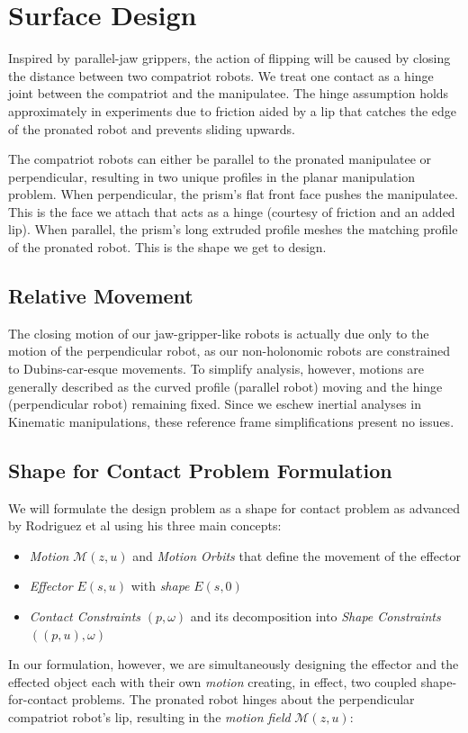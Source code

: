 \documentclass[letterpaper]{report}
\begin{document}
\section{Surface Design}
Inspired by parallel-jaw grippers, the action of flipping will be caused by closing the distance between two compatriot robots.
We treat one contact as a hinge joint between the compatriot and the manipulatee.
The hinge assumption holds approximately in experiments due to friction aided by a lip that catches the edge of the pronated robot and prevents sliding upwards.

The compatriot robots can either be parallel to the pronated manipulatee or perpendicular, resulting in two unique profiles in the planar manipulation problem.
When perpendicular, the prism's flat front face pushes the manipulatee. This is the face we attach that acts as a hinge (courtesy of friction and an added lip).
When parallel, the prism's long extruded profile meshes the matching profile of the pronated robot. This is the shape we get to design.

\subsection{Relative Movement}
The closing motion of our jaw-gripper-like robots is actually due only to the motion of the perpendicular robot, as our non-holonomic robots are constrained to Dubins-car-esque movements.
To simplify analysis, however, motions are generally described as the curved profile (parallel robot) moving and the hinge (perpendicular robot) remaining fixed.
Since we eschew inertial analyses in Kinematic manipulations, these reference frame simplifications present no issues.

\subsection{Shape for Contact Problem Formulation \cite{rodriguez2013effector}}
We will formulate the design problem as a shape for contact problem as advanced by Rodriguez et al\cite{rodriguez2013effector} using his three main concepts:
\begin{itemize}
  \item \textit{Motion} $\mathcal{M}(z,u)$ and \textit{Motion Orbits} that define the movement of the effector
  \item \textit{Effector} $E(s,u)$ with \textit{shape} $E(s,0)$
  \item \textit{Contact Constraints} $(p,\omega)$ and its decomposition into \textit{Shape Constraints} $((p,u),\omega)$
\end{itemize}
In our formulation, however, we are simultaneously designing the effector and the effected object each with their own \textit{motion} creating, in effect, two coupled shape-for-contact problems.
The pronated robot hinges about the perpendicular compatriot robot's lip, resulting in the \textit{motion field} $\mathcal{M}(z,u)$:
\end{document}
